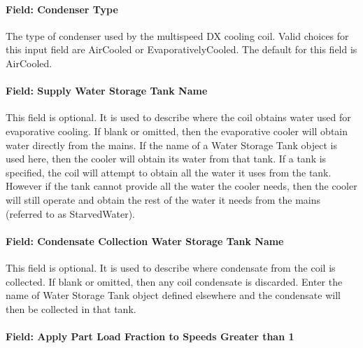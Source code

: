 \paragraph{Field: Condenser Type}\label{field-condenser-type-2}

The type of condenser used by the multispeed DX cooling coil. Valid choices for this input field are AirCooled or EvaporativelyCooled. The default for this field is AirCooled.

\paragraph{Field: Supply Water Storage Tank Name}\label{field-supply-water-storage-tank-name-3-000}

This field is optional. It is used to describe where the coil obtains water used for evaporative cooling. If blank or omitted, then the evaporative cooler will obtain water directly from the mains. If the name of a Water Storage Tank object is used here, then the cooler will obtain its water from that tank. If a tank is specified, the coil will attempt to obtain all the water it uses from the tank. However if the tank cannot provide all the water the cooler needs, then the cooler will still operate and obtain the rest of the water it needs from the mains (referred to as StarvedWater).

\paragraph{Field: Condensate Collection Water Storage Tank Name}\label{field-condensate-collection-water-storage-tank-name-5}

This field is optional. It is used to describe where condensate from the coil is collected. If blank or omitted, then any coil condensate is discarded. Enter the name of Water Storage Tank object defined elsewhere and the condensate will then be collected in that tank.

\paragraph{Field: Apply Part Load Fraction to Speeds Greater than 1}\label{field-apply-part-load-fraction-to-speeds-greater-than-1}

